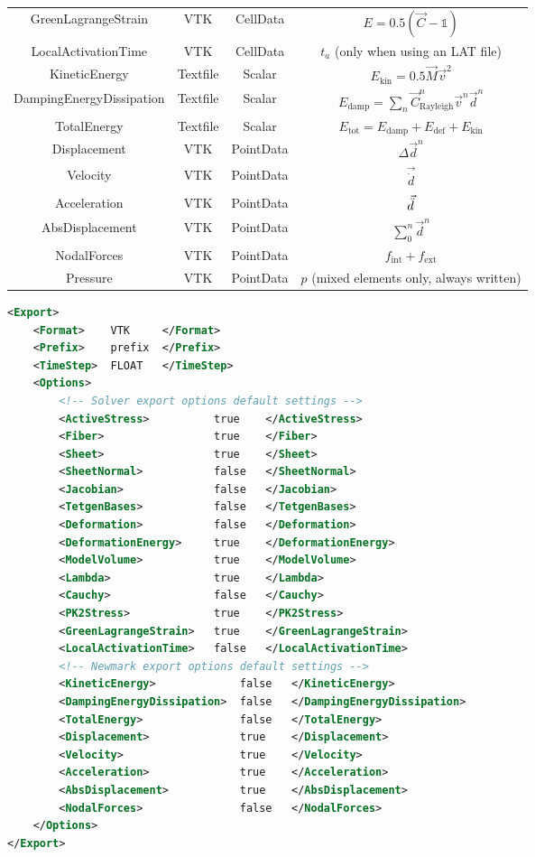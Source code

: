 \begin{table}[h!]
\begin{tabular}{cccc}
       GreenLagrangeStrain & VTK & CellData & $E =0.5 (\vec C - \mathds{1})$\\
       LocalActivationTime & VTK & CellData  & $t_a$ (only when using an LAT file)\\
       KineticEnergy & Textfile & Scalar  & $E_\mathrm{kin} = 0.5 \vec M \vec v^2$\\
       DampingEnergyDissipation & Textfile & Scalar & $E_\mathrm{damp} = \sum_n \vec C_\mathrm{Rayleigh}^n \vec v^n \vec d^n$ \\
       TotalEnergy & Textfile & Scalar  & $E_\mathrm{tot} = E_\mathrm{damp} + E_\mathrm{def} + E_\mathrm{kin}$\\
       Displacement & VTK & PointData  & $\Delta \vec d^n$\\
       Velocity & VTK & PointData  & $\vec{\dot{d}}$\\
       Acceleration & VTK & PointData  & $\vec{\Ddot{d}}$\\
       AbsDisplacement & VTK & PointData  & $\sum^n_{0} \vec d^n$\\
       NodalForces & VTK & PointData  & $f_\mathrm{int}+f_\mathrm{ext}$\\
       Pressure & VTK & PointData  & $p$ (mixed elements only, always written)\\
         \bottomrule
    \end{tabular}
\end{table}

\begin{lstlisting}[language=XML,caption=.xml settings for data export options.]
<Export>
    <Format>	VTK 	</Format>
    <Prefix> 	prefix	</Prefix>
    <TimeStep> 	FLOAT	</TimeStep>
    <Options>
    	<!-- Solver export options default settings -->
    	<ActiveStress> 			true 	</ActiveStress>
    	<Fiber> 				true 	</Fiber>
    	<Sheet>					true 	</Sheet>
    	<SheetNormal>			false	</SheetNormal>
    	<Jacobian>				false	</Jacobian>
    	<TetgenBases>			false	</TetgenBases>
        <Deformation>			false	</Deformation>
        <DeformationEnergy>		true	</DeformationEnergy>
        <ModelVolume>           true    </ModelVolume>
    	<Lambda>				true	</Lambda>
    	<Cauchy>				false	</Cauchy>
    	<PK2Stress>				true	</PK2Stress>
    	<GreenLagrangeStrain> 	true 	</GreenLagrangeStrain>
    	<LocalActivationTime>	false	</LocalActivationTime>
    	<!-- Newmark export options default settings -->
    	<KineticEnergy>				false	</KineticEnergy>
    	<DampingEnergyDissipation> 	false 	</DampingEnergyDissipation>
    	<TotalEnergy>				false	</TotalEnergy>
    	<Displacement>				true	</Displacement>
    	<Velocity>					true	</Velocity>
    	<Acceleration>				true	</Acceleration>
    	<AbsDisplacement>			true	</AbsDisplacement>
    	<NodalForces>				false	</NodalForces>
    </Options>
</Export>
\end{lstlisting}